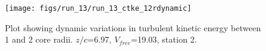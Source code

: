 \begin{figure}[H]
\centering
\texttt{[image: figs/run\_13/run\_13\_ctke\_12rdynamic]}
\caption{Plot showing dynamic variations in turbulent kinetic energy between 1 and 2 core radii. $z/c$=6.97, $V_{free}$=19.03, station 2.}
\label{fig:run_13_ctke_12rdynamic}
\end{figure}


